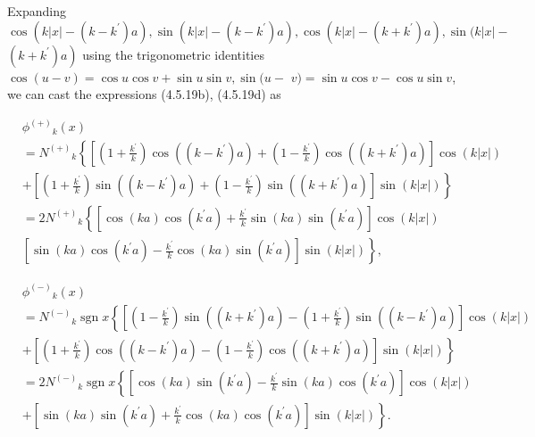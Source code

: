 \documentclass{article}
\begin{document}
Expanding $\cos \left(k|x|-\left(k-k^{\prime}\right) a\right), \sin \left(k|x|-\left(k-k^{\prime}\right) a\right), \cos \left(k|x|-\left(k+k^{\prime}\right) a\right), \sin (k|x|-$ $\left.\left(k+k^{\prime}\right) a\right)$ using the trigonometric identities $\cos (u-v)=\cos u \cos v+\sin u \sin v, \sin (u-$ $v)=\sin u \cos v-\cos u \sin v$, we can cast the expressions (4.5.19b), (4.5.19d) as
 
\begin{align*}
& \phi^{(+)}{ }_{k}(x)  \tag{4.5.27a}\\
& =N^{(+)}{ }_{k}\left\{\left[\left(1+\frac{k^{\prime}}{k}\right) \cos \left(\left(k-k^{\prime}\right) a\right)+\left(1-\frac{k^{\prime}}{k}\right) \cos \left(\left(k+k^{\prime}\right) a\right)\right] \cos (k|x|)\right. \\
& \left.+\left[\left(1+\frac{k^{\prime}}{k}\right) \sin \left(\left(k-k^{\prime}\right) a\right)+\left(1-\frac{k^{\prime}}{k}\right) \sin \left(\left(k+k^{\prime}\right) a\right)\right] \sin (k|x|)\right\} \\
& =2 N^{(+)}{ }_{k}\left\{\left[\cos (k a) \cos \left(k^{\prime} a\right)+\frac{k^{\prime}}{k} \sin (k a) \sin \left(k^{\prime} a\right)\right] \cos (k|x|)\right. \\
& \left.\left[\sin (k a) \cos \left(k^{\prime} a\right)-\frac{k^{\prime}}{k} \cos (k a) \sin \left(k^{\prime} a\right)\right] \sin (k|x|)\right\},
\end{align*}
 
 
\begin{align*}
& \phi^{(-)}{ }_{k}(x)  \tag{4.5.27b}\\
& =N^{(-)}{ }_{k} \operatorname{sgn} x\left\{\left[\left(1-\frac{k^{\prime}}{k}\right) \sin \left(\left(k+k^{\prime}\right) a\right)-\left(1+\frac{k^{\prime}}{k}\right) \sin \left(\left(k-k^{\prime}\right) a\right)\right] \cos (k|x|)\right. \\
& \left.+\left[\left(1+\frac{k^{\prime}}{k}\right) \cos \left(\left(k-k^{\prime}\right) a\right)-\left(1-\frac{k^{\prime}}{k}\right) \cos \left(\left(k+k^{\prime}\right) a\right)\right] \sin (k|x|)\right\} \\
& =2 N^{(-)}{ }_{k} \operatorname{sgn} x\left\{\left[\cos (k a) \sin \left(k^{\prime} a\right)-\frac{k^{\prime}}{k} \sin (k a) \cos \left(k^{\prime} a\right)\right] \cos (k|x|)\right. \\
& \left.+\left[\sin (k a) \sin \left(k^{\prime} a\right)+\frac{k^{\prime}}{k} \cos (k a) \cos \left(k^{\prime} a\right)\right] \sin (k|x|)\right\} .
\end{align*}
 
\end{document}
